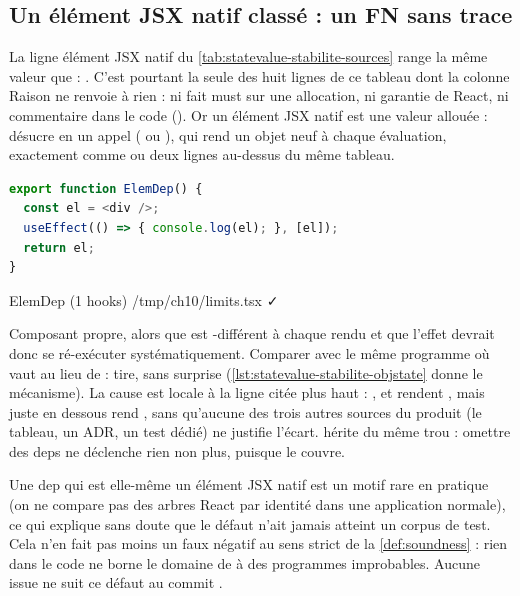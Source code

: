\subsection{Un élément JSX natif classé  : un FN sans trace}
\label{sec:statevalue-stabilite-nativeelem}

La ligne \og élément JSX natif\fg{} du \cref{tab:statevalue-stabilite-sources}
range la même valeur que  : . C'est pourtant
la seule des huit lignes de ce tableau dont la colonne \og Raison\fg{} ne
renvoie à rien : ni fait must sur une allocation, ni garantie de React, ni
commentaire dans le code ().
Or un élément JSX natif est une valeur allouée :  désucre en un
appel ( ou ), qui rend un objet neuf à
chaque évaluation, exactement comme \code{{}} ou \code{() => {}} deux
lignes au-dessus du même tableau.

\begin{lstlisting}[language=TypeScript,caption={Un élément natif en dep (\file{/tmp/ch10/limits.tsx}, extrait)},label={lst:statevalue-stabilite-elemdep}]
export function ElemDep() {
  const el = <div />;
  useEffect(() => { console.log(el); }, [el]);
  return el;
}
\end{lstlisting}

\begin{sortie}
  ElemDep  (1 hooks)  /tmp/ch10/limits.tsx  ✓
\end{sortie}

Composant propre, alors que  est -différent à
chaque rendu et que l'effet devrait donc se ré-exécuter systématiquement.
Comparer avec le même programme où  vaut \code{{}} au lieu de
 :  tire, sans surprise
(\cref{lst:statevalue-stabilite-objstate} donne le mécanisme). La cause est
locale à la ligne citée plus haut : , 
et  rendent , mais 
juste en dessous rend , sans qu'aucune des trois autres
sources du produit (le tableau, un ADR, un test dédié) ne justifie l'écart.
 hérite du même trou : omettre  des deps ne
déclenche rien non plus, puisque  le couvre.

\begin{piege}
  Une dep qui est elle-même un élément JSX natif est un motif rare en
  pratique (on ne compare pas des arbres React par identité dans une
  application normale), ce qui explique sans doute que le défaut n'ait
  jamais atteint un corpus de test. Cela n'en fait pas moins un faux
  négatif au sens strict de la \cref{def:soundness} : rien dans le code ne
  borne le domaine de  à des programmes \og improbables\fg{}.
  Aucune issue ne suit ce défaut au commit \snapshotCommit{}.
\end{piege}

